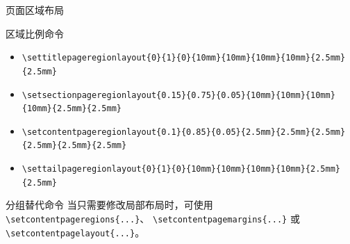 \documentclass[aspectratio=169,10pt]{ctexbeamer}
\begin{document}
\begin{academicframe}{页面区域布局}
  \begin{block}{区域比例命令}
    \scriptsize
    \begin{itemize}
      \item \texttt{\textbackslash settitlepageregionlayout\{0\}\{1\}\{0\}\{10mm\}\{10mm\}\{10mm\}\{10mm\}\{2.5mm\}\{2.5mm\}}
      \item \texttt{\textbackslash setsectionpageregionlayout\{0.15\}\{0.75\}\{0.05\}\{10mm\}\{10mm\}\{10mm\}\{10mm\}\{2.5mm\}\{2.5mm\}}
      \item \texttt{\textbackslash setcontentpageregionlayout\{0.1\}\{0.85\}\{0.05\}\{2.5mm\}\{2.5mm\}\{2.5mm\}\{2.5mm\}\{2.5mm\}\{2.5mm\}}
      \item \texttt{\textbackslash settailpageregionlayout\{0\}\{1\}\{0\}\{10mm\}\{10mm\}\{10mm\}\{10mm\}\{2.5mm\}\{2.5mm\}}
    \end{itemize}
  \end{block}

  \vspace{0.35em}
  \begin{exampleblock}{分组替代命令}
    \scriptsize
    当只需要修改局部布局时，可使用
    \texttt{\textbackslash setcontentpageregions\{...\}}、
    \texttt{\textbackslash setcontentpagemargins\{...\}} 或
    \texttt{\textbackslash setcontentpagelayout\{...\}}。
  \end{exampleblock}
\end{academicframe}
\end{document}
